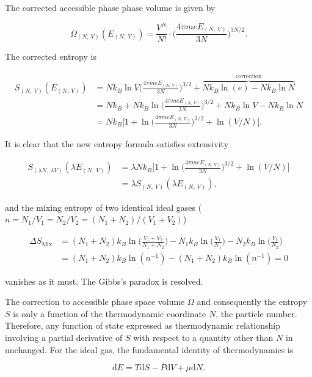 \documentclass[11pt]{article}
\begin{document}
The corrected accessible phase phase volume is given by

\[
\Omega_{(N,~V)}(E_{(N,~V)}) = \frac{V^{N}}{N!} \cdot \bigg(\frac{4 \pi m e E_{(N,~V)}}{3 N}\bigg)^{3N/2}.
\]

The corrected entropy is

\begin{align*}
S_{(N,~V)}(E_{(N,~V)}) &= N k_{B} \ln V \bigg(\frac{4 \pi m e E_{(N,~V)}}{3 N}\bigg)^{3/2} + \overbrace{N k_{B} \ln (e) - N k_{B} \ln N }^{\text{correction}} \\
&= N k_{B} + N k_{B} \ln \bigg(\frac{4 \pi m e E_{(N,~V)}}{3 N}\bigg)^{3/2} + N k_{B} \ln V - N k_{B} \ln N \\ 
&= N k_{B} \bigg[1 + \ln \bigg(\frac{4 \pi m e E_{(N,~V)}}{3 N}\bigg)^{3/2} + \ln (V/N) \bigg].
\end{align*}

It is clear that the new entropy formula satisfies extensivity

\begin{align*}
S_{(\lambda N,~\lambda V)}(\lambda E_{(N,~V)}) &= \lambda N k_{B} \bigg[1 + \ln \bigg(\frac{4 \pi m e E_{(N,~V)}}{3 N}\bigg)^{3/2} + \ln (V/N) \bigg] \\
&= \lambda S_{(N,~V)}(\lambda E_{(N,~V)}),
\end{align*}

and the mixing entropy of two identical ideal gases (\(n = N_{1}/V_{1} = N_{2}/V_{2} = (N_{1}+N_{2})/(V_{1} + V_{2})\))

\begin{align*}
\Delta S_{\text {Mix}} &= \left(N_{1}+N_{2}\right) k_{B} \ln \bigg(\frac{V_{1}+V_{2}}{N_{1}+N_{2}}\bigg) - N_{1} k_{B} \ln \bigg(\frac{V_{1}}{N_{1}}\bigg) - N_{2} k_{B} \ln \bigg(\frac{V_{2}}{N_{2}}\bigg) \\
&= \left(N_{1}+N_{2}\right) k_{B} \ln (n^{-1}) - (N_{1} + N_{2}) k_{B} \ln (n^{-1}) = 0
\end{align*}

vanishes as it must. The Gibbs's paradox is resolved. 

The correction to accessible phase space volume \(\Omega\) and consequently the entropy \(S\) is only a function of the thermodynamic coordinate \(N\), the particle number. Therefore, any function of state expressed as thermodynamic relationship involving a partial derivative of \(S\) with respect to a quantity other than \(N\) in unchanged. For the ideal gas, the fundamental identity of thermodynamics is

\[
\mathrm{d}E = T \mathrm{d} S - P \mathrm{d}V + \mu \mathrm{d}N.
\]
\end{document}
